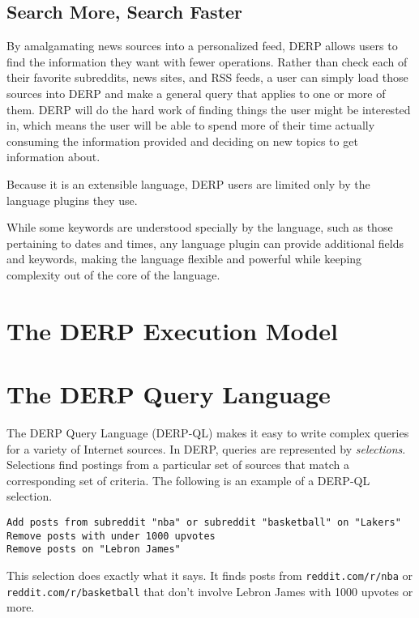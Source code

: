 \documentclass{article}
\begin{document}
\subsection{Search More, Search Faster}
By amalgamating news sources into a personalized feed, DERP allows users to find the information they want with fewer operations. Rather than check each of their favorite subreddits, news sites, and RSS feeds, a user can simply load those sources into DERP and make a general query that applies to one or more of them. DERP will do the hard work of finding things the user might be interested in, which means the user will be able to spend more of their time actually consuming the information provided and deciding on new topics to get information about.

Because it is an extensible language, DERP users are limited only by the language plugins they use. 
\begin{comment}
@ADS Is this also something we officially decided on? I felt that we were leaning toward it
\end{comment}
While some keywords are understood specially by the language, such as those pertaining to dates and times, any language plugin can provide additional fields and keywords, making the language flexible and powerful while keeping  complexity out of the core of the language.


\newpage
\section{\textbf{The DERP Execution Model}}




\newpage
\section{\textbf{The DERP Query Language}}
The DERP Query Language (DERP-QL) makes it easy to write complex queries for a variety of Internet sources. In DERP, queries are represented by \textit{selections}. Selections find postings from a particular set of sources that match a corresponding set of criteria. The following is an example of a DERP-QL selection.

\begin{lstlisting}
Add posts from subreddit "nba" or subreddit "basketball" on "Lakers"
Remove posts with under 1000 upvotes
Remove posts on "Lebron James"
\end{lstlisting}

This selection does exactly what it says. It finds posts from \texttt{reddit.com/r/nba} or \\ \texttt{reddit.com/r/basketball} that don't involve Lebron James with 1000 upvotes or more.






\end{document}
